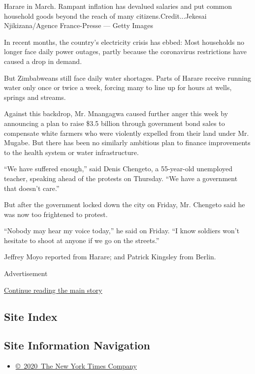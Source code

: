 Harare in March. Rampant inflation has devalued salaries and put common
household goods beyond the reach of many citizens.Credit...Jekesai
Njikizana/Agence France-Presse --- Getty Images

In recent months, the country's electricity crisis has ebbed: Most
households no longer face daily power outages, partly because the
coronavirus restrictions have caused a drop in demand.

But Zimbabweans still face daily water shortages. Parts of Harare
receive running water only once or twice a week, forcing many to line up
for hours at wells, springs and streams.

Against this backdrop, Mr. Mnangagwa caused further anger this week by
announcing a plan to raise \$3.5 billion through government bond sales
to compensate white farmers who were violently expelled from their land
under Mr. Mugabe. But there has been no similarly ambitious plan to
finance improvements to the health system or water infrastructure.

``We have suffered enough,'' said Denis Chengeto, a 55-year-old
unemployed teacher, speaking ahead of the protests on Thursday. ``We
have a government that doesn't care.''

But after the government locked down the city on Friday, Mr. Chengeto
said he was now too frightened to protest.

``Nobody may hear my voice today,'' he said on Friday. ``I know soldiers
won't hesitate to shoot at anyone if we go on the streets.''

Jeffrey Moyo reported from Harare; and Patrick Kingsley from Berlin.

Advertisement

\protect\hyperlink{after-bottom}{Continue reading the main story}

\hypertarget{site-index}{%
\subsection{Site Index}\label{site-index}}

\hypertarget{site-information-navigation}{%
\subsection{Site Information
Navigation}\label{site-information-navigation}}

\begin{itemize}
\tightlist
\item
  \href{https://help.nytimes3xbfgragh.onion/hc/en-us/articles/115014792127-Copyright-notice}{©~2020~The
  New York Times Company}
\end{itemize}

